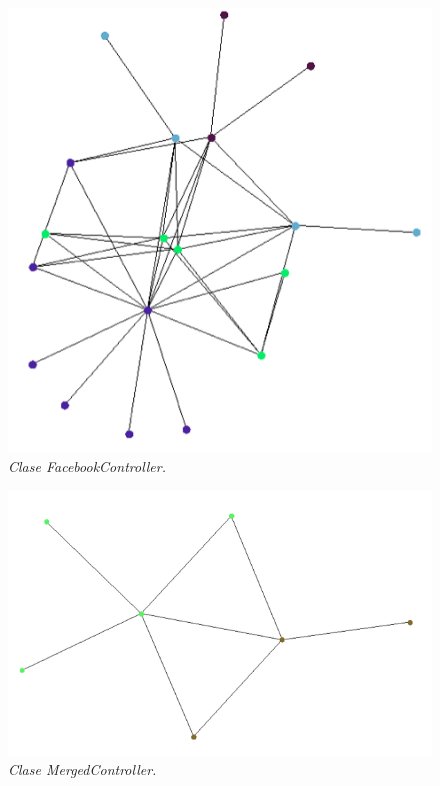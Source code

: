 \begin{figure}[H]
	\centering
	\includegraphics[scale=.4]{images/Figura5-6}
	\caption{\em Clase FacebookController.}
	\label{fig:des-im6}
\end{figure}

\begin{figure}[H]
	\centering
	\includegraphics[scale=.4]{images/Figura5-7}
	\caption{\em Clase MergedController.}
	\label{fig:des-im7}
\end{figure}

